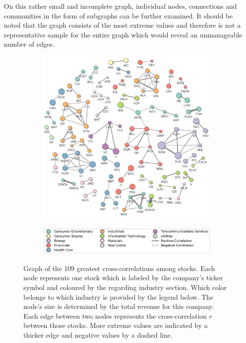 On this rather small and incomplete graph, individual nodes, connections and communities in the form of subgraphs can be further examined. It should be noted that the graph consists of the most extreme values and therefore is not a representative sample for the entire graph which would reveal an unmanageable number of edges.

\begin{figure}
    \centering
    \begin{subfigure}{\textwidth}
        \centering
        \includegraphics[width=\textwidth]{figures/regression/graph-corr-resid-999-42-with-neg.jpg}
    \end{subfigure}
    \vfill
    \begin{subfigure}{\textwidth}
        \centering
        \includegraphics[width=\textwidth]{figures/graph-legend.pdf}
    \end{subfigure}

    \caption{Graph of the 109 greatest cross-correlations among stocks. Each node represents one stock which is labeled by the company's ticker symbol and coloured by the regarding industry section. Which color belongs to which industry is provided by the legend below. The node's size is determined by the total revenue for this company. Each edge between two nodes represents the cross-correlation $r$ between those stocks. More extreme values are indicated by a thicker edge and negative values by a dashed line.}
    \label{fig:graph-correlations}
\end{figure}

